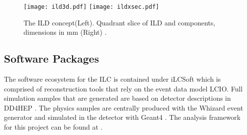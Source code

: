 \begin{figure}

\texttt{[image: ild3d.pdf]}
\texttt{[image: ildxsec.pdf]}
\caption{The ILD concept(Left). Quadrant slice of ILD and components, dimensions in mm (Right) \cite{tdrdet}.}
\label{fig:ilddet}
\end{figure}
\subsection{Software Packages}
\label{ilcsoft}

The software ecosystem for the ILC is contained under iLCSoft \cite{ilcsoft} which is comprised of reconstruction tools that rely on the event data model LCIO\cite{lcio}. Full simulation samples that are generated are based on detector descriptions in DD4HEP \cite{dd4hep}. The physics samples are centrally produced with the Whizard event generator \cite{ whizard} and simulated in the detector with Geant4 \cite{geant4}. The analysis framework for this project can be found at \cite{wwrepo}.


